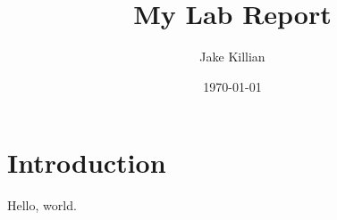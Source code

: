 \documentclass[11pt]{article}
\title{My Lab Report}
\author{Jake Killian}
\date{\today}
\begin{document}
\maketitle
\section{Introduction}
Hello, world.
\end{document}
